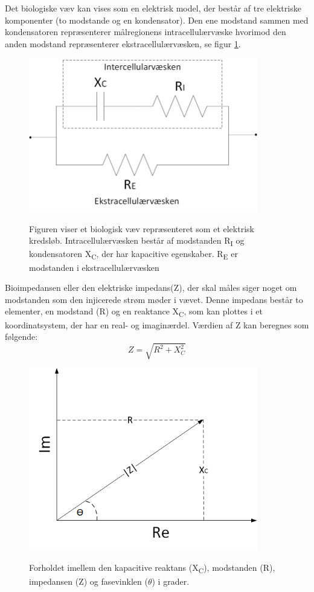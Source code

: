 Det biologiske væv kan vises som en elektrisk model, der består af tre elektriske komponenter (to modstande og en kondensator). Den ene modstand sammen med kondensatoren repræsenterer målregionens intracellulærvæske hvorimod den anden modstand repræsenterer ekstracellulærvæsken, se figur \ref{fig:vaevsmodel}.

\begin{figure}[H]
\centering
{\includegraphics[width=10cm]
{Figure/vaevsmodel}}
\caption{Figuren viser et biologisk væv repræsenteret som et elektrisk kredsløb. Intracellulærvæsken består af modstanden  R\textsubscript{I} og kondensatoren X\textsubscript{C}, der har kapacitive egenskaber. R\textsubscript{E} er modstanden i ekstracellulærvæsken}
\label{fig:vaevsmodel}
\end{figure}

\pagebreak


Bioimpedansen eller den elektriske impedans(Z), der skal måles siger noget om modstanden som den injicerede strøm møder i vævet. Denne impedans består to elementer, en modstand (R) og en reaktance X\textsubscript{C}, som kan plottes i et koordinatsystem, der har en real- og imaginærdel. Værdien af Z kan beregnes som følgende: 
\begin{equation}
Z=\sqrt{R^{2}+X^{2}_{C}}
\end{equation} 

\begin{figure}[H]
\centering
{\includegraphics[width=10cm]
{Figure/vektor}}
\caption{Forholdet imellem den kapacitive reaktans (X\textsubscript{C}), modstanden (R), impedansen (Z) og fasevinklen ($\theta$) i grader.}
\label{fig:vektor}
\end{figure}


